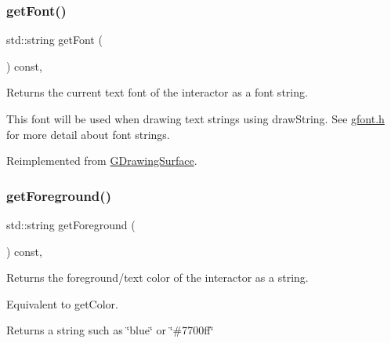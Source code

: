 \subsubsection{\texorpdfstring{get\+Font()}{getFont()}}
{\footnotesize\ttfamily std\+::string get\+Font (\begin{DoxyParamCaption}{ }\end{DoxyParamCaption}) const\hspace{0.3cm}{\ttfamily [override]}, {\ttfamily [virtual]}}



Returns the current text font of the interactor as a font string. 

This font will be used when drawing text strings using draw\+String. See \mbox{\hyperlink{gfont_8h_source}{gfont.\+h}} for more detail about font strings. 

Reimplemented from \mbox{\hyperlink{classsgl_1_1GDrawingSurface_a894a5502900794eeb27d084c21f1d77d}{G\+Drawing\+Surface}}.

\mbox{\label{classsgl_1_1GInteractor_a4fa2d8b0192a3a5b4af4bbfe71194d03}} 
\subsubsection{\texorpdfstring{get\+Foreground()}{getForeground()}\hspace{0.1cm}{\footnotesize\ttfamily [1/2]}}
{\footnotesize\ttfamily std\+::string get\+Foreground (\begin{DoxyParamCaption}{ }\end{DoxyParamCaption}) const\hspace{0.3cm}{\ttfamily [virtual]}, {\ttfamily [inherited]}}



Returns the foreground/text color of the interactor as a string. 

Equivalent to get\+Color. \begin{DoxyReturn}{Returns}
a string such as \char`\"{}blue\char`\"{} or \char`\"{}\#7700ff\char`\"{} 
\end{DoxyReturn}
\mbox{\label{classsgl_1_1GDrawingSurface_a4fa2d8b0192a3a5b4af4bbfe71194d03}} 
